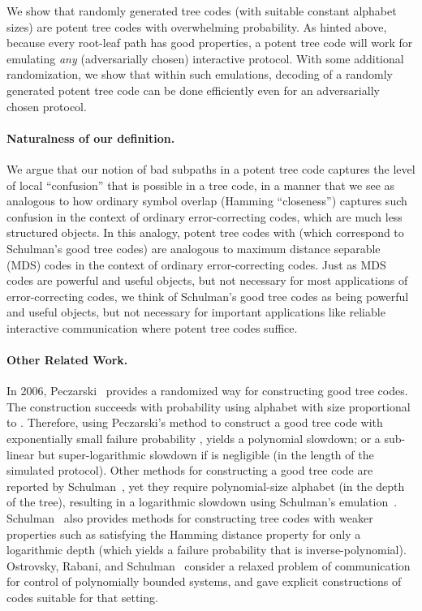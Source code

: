 \documentclass[ letterpaper, 11pt]{article}
\newcommand{\potent}{potent\xspace}
\begin{document}
We show that randomly generated tree codes (with suitable constant
alphabet sizes) are potent tree codes with overwhelming probability.
As hinted above, because every root-leaf path has good properties, a
potent tree code will work for emulating \emph{any} (adversarially
chosen) interactive protocol.  With some additional randomization,
we show that within such emulations, decoding of a randomly
generated potent tree code can be done efficiently even for an
adversarially chosen protocol.


\paragraph{Naturalness of our definition.}
We argue that our notion of bad subpaths in a \potent tree code
captures the level of local ``confusion'' that is possible in a tree
code, in a manner that we see as analogous to how ordinary symbol
overlap (Hamming ``closeness'') captures such confusion in the
context of ordinary error-correcting codes, which are much less
structured objects.  In this analogy, \potent tree codes with
 (which correspond to Schulman's good tree codes) are
analogous to maximum distance separable (MDS) codes in the context
of ordinary error-correcting codes.  Just as MDS codes are powerful
and useful objects, but not necessary for most applications of
error-correcting codes, we think of Schulman's good tree codes as
being powerful and useful objects, but not necessary for important
applications like reliable interactive communication where \potent
tree codes suffice.


\paragraph{Other Related Work.}
In 2006, Peczarski~\cite{peczarski06} provides a randomized way for
constructing good tree codes. The construction succeeds with
probability  using alphabet with size proportional to
. Therefore, using Peczarski's method to construct a
good tree code with exponentially small failure probability
, yields a polynomial slowdown; or a sub-linear but
super-logarithmic slowdown if   is negligible (in the
length of the simulated protocol). Other methods for constructing a
good tree code are reported by Schulman~\cite{schulman-email}, yet
they require polynomial-size alphabet (in the depth of the tree),
resulting in a logarithmic slowdown using Schulman's
emulation~\cite{schulman93}. Schulman~\cite{schulman-email} also
provides methods for constructing tree codes with weaker properties
such as satisfying the Hamming distance property for only a
logarithmic depth (which yields a failure probability that is
inverse-polynomial). Ostrovsky, Rabani, and Schulman~\cite{ORS05}
consider a relaxed problem of communication for control of
polynomially bounded systems, and gave explicit constructions of
codes suitable for that setting.
\end{document}
